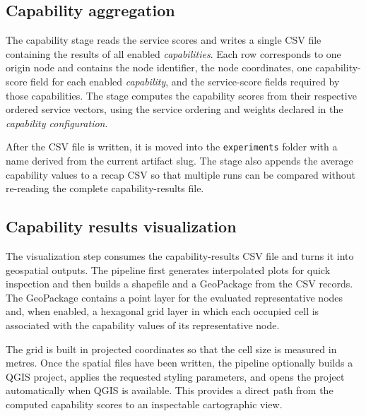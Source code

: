 \documentclass{article}
\begin{document}
\subsection{Capability aggregation}
The capability stage reads the service scores and writes a single CSV file
containing the results of all enabled \emph{capabilities}. Each row corresponds
to one origin node and contains the node identifier, the node coordinates, one
capability-score field for each enabled \emph{capability}, and the service-score
fields required by those capabilities. The stage computes the capability scores
from their respective ordered service vectors, using the service ordering and
weights declared in the \emph{capability configuration}.

After the CSV file is written, it is moved into the \texttt{experiments}
folder with a name derived from the current artifact slug. The stage also
appends the average capability values to a recap CSV so that multiple runs can
be compared without re-reading the complete capability-results file.

\subsection{Capability results visualization}
The visualization step consumes the capability-results CSV file and turns it
into geospatial outputs. The pipeline first generates interpolated plots for
quick inspection and then builds a shapefile and a GeoPackage from the CSV
records. The GeoPackage contains a point layer for the evaluated representative nodes
and, when enabled, a hexagonal grid layer in which each occupied cell is
associated with the capability values of its representative node.

The grid is built in projected coordinates so that the cell size is measured in
metres. Once the spatial files have been written, the pipeline optionally builds
a QGIS project, applies the requested styling parameters, and opens the project
automatically when QGIS is available. This provides a direct path from the
computed capability scores to an inspectable cartographic view.
\end{document}
